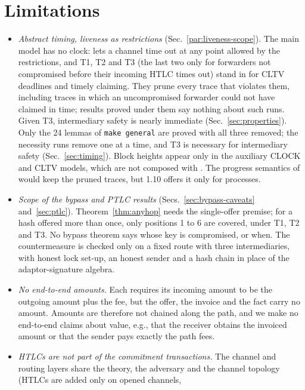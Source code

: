 \section{Limitations}\label{sec:limitations}

\begin{itemize}[\setlength{\IEEElabelindent}{0pt}]
\item \emph{Abstract timing, liveness as restrictions} (Sec.~\ref{par:liveness-scope}). The main
  model has no clock:  lets a channel time out at any point allowed by the
  restrictions, and T1, T2 and T3 (the last two only for forwarders not compromised before their
  incoming HTLC times out) stand in for CLTV deadlines and timely claiming. They prune every
  trace that violates them, including traces in which an uncompromised forwarder could not have
  claimed in time; results proved under them say nothing about such runs. Given T3,
  intermediary safety is nearly immediate (Sec.~\ref{sec:properties}). Only the 24 lemmas of
  \texttt{make general} are proved with all three removed;
  the necessity runs remove one at a time, and T3 is necessary for intermediary safety
  (Sec.~\ref{sec:timing}). Block heights appear only in the auxiliary CLOCK and CLTV models, which
  are not composed with . The progress semantics of~\cite{backes2017}
  would keep the pruned traces, but \tamarin{} 1.10 offers it only for \sapic{} processes.
\item \emph{Scope of the bypass and PTLC results} (Secs.~\ref{sec:bypass-caveats}
  and~\ref{sec:ptlc}). Theorem~\ref{thm:anyhop} needs the single-offer premise; for a hash
  offered more than once, only positions 1 to 6 are covered, under T1, T2 and T3. No bypass
  theorem says whose key is compromised, or when. The countermeasure is checked only on a fixed
  route with three intermediaries, with honest lock set-up, an honest sender and a hash chain in
  place of the adaptor-signature algebra.
\item \emph{No end-to-end amounts.} Each  requires its incoming amount to be the outgoing amount plus the fee, but the offer,
  the invoice and the  fact carry no amount. Amounts are therefore not chained along
  the path, and we make no end-to-end claims about value, e.g., that the receiver obtains the
  invoiced amount or that the sender pays exactly the path fees.
\item \emph{HTLCs are not part of the commitment transactions.} The channel and routing layers share the theory,
  the adversary and the channel topology (HTLCs are added only on opened channels,

\end{itemize}
